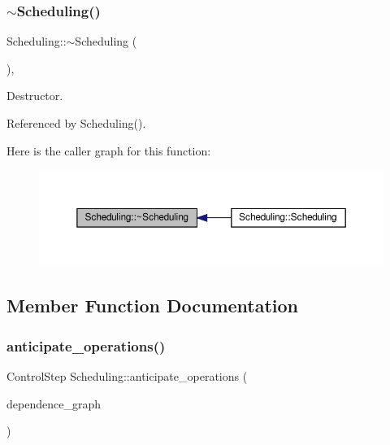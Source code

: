 \subsubsection{\texorpdfstring{$\sim$\+Scheduling()}{~Scheduling()}}
{\footnotesize\ttfamily Scheduling\+::$\sim$\+Scheduling (\begin{DoxyParamCaption}{ }\end{DoxyParamCaption})\hspace{0.3cm}{\ttfamily [override]}, {\ttfamily [default]}}



Destructor. 



Referenced by Scheduling().

Here is the caller graph for this function\+:
\nopagebreak
\begin{figure}[H]
\begin{center}
\leavevmode
\includegraphics[width=350pt]{db/d2c/classScheduling_a943ed0dbb41df6925eebb44a33d8f74f_icgraph}
\end{center}
\end{figure}


\subsection{Member Function Documentation}
\mbox{\label{classScheduling_acbaf1ca26611af23e5ebcfc21b2ea105}} 
\subsubsection{\texorpdfstring{anticipate\+\_\+operations()}{anticipate\_operations()}}
{\footnotesize\ttfamily Control\+Step Scheduling\+::anticipate\+\_\+operations (\begin{DoxyParamCaption}\item[{const \hyperlink{op__graph_8hpp_a9a0b240622c47584bee6951a6f5de746}{Op\+Graph\+Const\+Ref}}]{dependence\+\_\+graph }\end{DoxyParamCaption})\hspace{0.3cm}{\ttfamily [protected]}}



